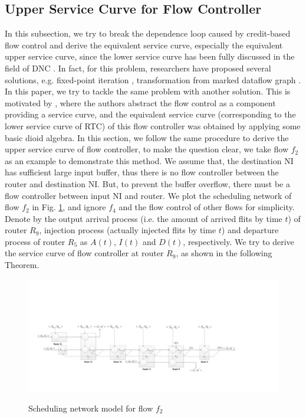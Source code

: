 \documentclass[10pt,journal]{IEEEtran}
\begin{document}
\subsection{Upper Service Curve for Flow Controller}\label{flowcontrol}
In this subsection, we try to break the dependence loop caused by credit-based flow control and derive the equivalent service curve, especially the equivalent upper service curve, since the lower service curve has been fully discussed in the field of DNC \cite{Boudec2001Network}. In fact, for this problem, researchers have proposed several solutions, e.g. fixed-point iteration \cite{schioler2005network}, transformation from marked dataflow graph \cite{Thiele:2009:MPA:1629335.1629353}. In this paper, we try to tackle the same problem with another solution. This is motivated by \cite{qian2009analysis}, where the authors abstract the flow control as a component providing a service curve, and the equivalent service curve (corresponding to the lower service curve of RTC) of this flow controller was obtained by applying some basic dioid algebra. In this section, we follow the same procedure to derive the upper service curve of flow controller, to make the question clear, we take flow $f_2$ as an example to demonstrate this method. We assume that, the destination NI has sufficient large input buffer, thus there is no flow controller between the router and destination NI. But, to prevent the buffer overflow, there must be a flow controller between input NI and router. We plot the scheduling network of flow $f_2$ in Fig. \ref{f2}, and ignore $f_4$ and the flow control of other flows for simplicity. Denote by the output arrival process (i.e. the amount of arrived flits by time $t$) of router $R_9$, injection process (actually injected flits by time $t$) and departure process of router $R_{5}$ as $A(t)$, $I(t)$ and $D(t)$, respectively. We try to derive the service curve of flow controller at router $R_9$, as shown in the following Theorem.
\begin{figure}
  \centering
  \includegraphics[scale=0.35]{figures/f2.pdf}\\
  \caption{Scheduling network model for flow $f_2$}\label{f2}
\end{figure}
\end{document}
